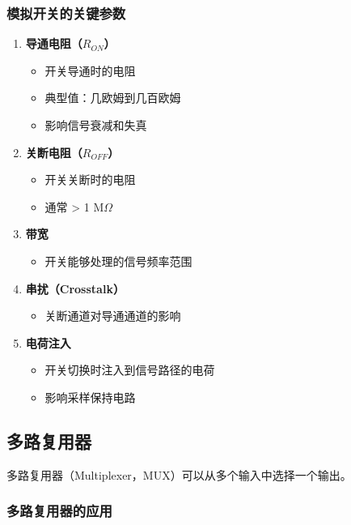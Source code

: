 \subsubsection{模拟开关的关键参数}

\begin{enumerate}
  \item \textbf{导通电阻（$R_{ON}$）}
    \begin{itemize}
      \item 开关导通时的电阻
      \item 典型值：几欧姆到几百欧姆
      \item 影响信号衰减和失真
    \end{itemize}

  \item \textbf{关断电阻（$R_{OFF}$）}
    \begin{itemize}
      \item 开关关断时的电阻
      \item 通常 > 1 M$\Omega$
    \end{itemize}

  \item \textbf{带宽}
    \begin{itemize}
      \item 开关能够处理的信号频率范围
    \end{itemize}

  \item \textbf{串扰（Crosstalk）}
    \begin{itemize}
      \item 关断通道对导通通道的影响
    \end{itemize}

  \item \textbf{电荷注入}
    \begin{itemize}
      \item 开关切换时注入到信号路径的电荷
      \item 影响采样保持电路
    \end{itemize}
\end{enumerate}

\subsection{多路复用器}

多路复用器（Multiplexer，MUX）可以从多个输入中选择一个输出。

\subsubsection{多路复用器的应用}

